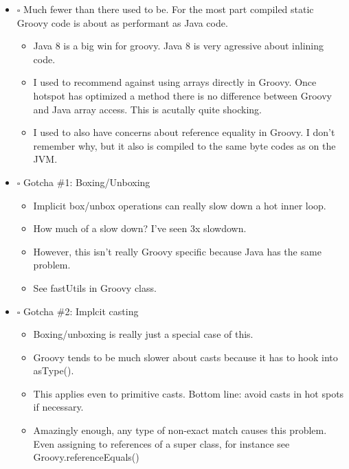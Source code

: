 \documentclass[11pt]{article}
\begin{document}
\begin{itemize}
\item $\square$ Much fewer than there used to be. For the most part compiled static Groovy code is about as performant as Java code.

\begin{itemize}
\item Java 8 is a big win for groovy. Java 8 is very agressive about inlining code.

\item I used to recommend against using arrays directly in Groovy. Once hotspot has optimized a method there is no difference between Groovy and Java array access. This is acutally quite shocking.

\item I used to also have concerns about reference equality in Groovy. I don't remember why, but it also is compiled to the same byte codes as on the JVM.
\end{itemize}

\item $\square$ Gotcha \#1: Boxing/Unboxing

\begin{itemize}
\item Implicit box/unbox operations can really slow down a hot inner loop.

\item How much of a slow down? I've seen 3x slowdown.

\item However, this isn't really Groovy specific because Java has the same problem.

\item See fastUtils in Groovy class.
\end{itemize}

\item $\square$ Gotcha \#2: Implcit casting

\begin{itemize}
\item Boxing/unboxing is really just a special case of this.

\item Groovy tends to be much slower about casts because it has to hook into asType().

\item This applies even to primitive casts. Bottom line: avoid casts in hot spots if necessary.

\item Amazingly enough, any type of non-exact match causes this problem. Even assigning to references of a super class, for instance see Groovy.referenceEquals()
\end{itemize}


\end{itemize}
\end{document}
